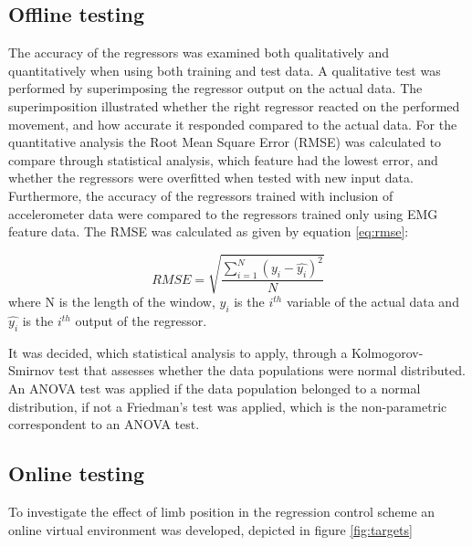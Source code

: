 \begin{multicols}{2}
\subsection*{Offline testing}
The accuracy of the regressors was examined both qualitatively and quantitatively when using both training and test data. A qualitative test was performed by superimposing the regressor output on the actual data. The superimposition illustrated whether the right regressor reacted on the performed movement, and how accurate it responded compared to the actual data. For the quantitative analysis the Root Mean Square Error (RMSE) was calculated to compare through statistical analysis, which feature had the lowest error, and whether the regressors were overfitted when tested with new input data. Furthermore, the accuracy of the regressors trained with inclusion of accelerometer data were compared to the regressors trained only using EMG feature data. The RMSE was calculated as given by equation \ref{eq:rmse}:

\begin{equation} \label{eq:rmse}
RMSE = \sqrt{\frac{\sum\limits_{i=1}^N(y_i - \hat{y_i})^2}{N}}
\end{equation}
where N is the length of the window, $y_i$ is the $i^{th}$ variable of the actual data and $\hat{y_i}$ is the $i^{th}$ output of the regressor.

It was decided, which statistical analysis to apply, through a Kolmogorov-Smirnov test that assesses whether the data populations were normal distributed. An ANOVA test was applied if the data population belonged to a normal distribution, if not a Friedman's test was applied, which is the non-parametric correspondent to an ANOVA test.

\subsection*{Online testing}
To investigate the effect of limb position in the regression control scheme an online virtual environment was developed, depicted in figure \ref{fig:targets}


\end{multicols}
